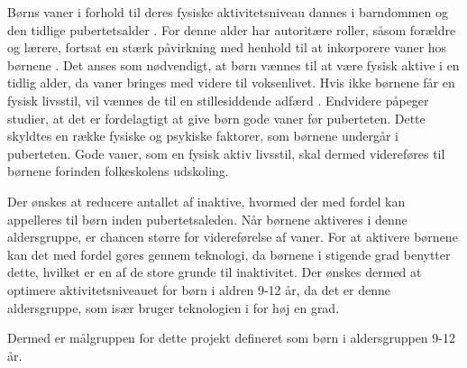Børns vaner i forhold til deres fysiske aktivitetsniveau dannes i barndommen og den tidlige pubertetsalder \citep{F.SallisG.Simons-MortonJ.Stone1992}. For denne alder har autoritære roller, såsom forældre og lærere, fortsat en stærk påvirkning med henhold til at inkorporere vaner hos børnene \citep{L.MeyerP.Gullotta2012}. \newline
Det anses som nødvendigt, at børn vænnes til at være fysisk aktive i en tidlig alder, da vaner bringes med videre til voksenlivet. Hvis ikke børnene får en fysisk livsstil, vil vænnes de til en stillesiddende adfærd \citep{Nabe-NielsenSundhedsministerietetal.2005,P.J.KremersBrug2008,L.MeyerP.Gullotta2012}. Endvidere påpeger studier, at det er fordelagtigt at give børn gode vaner før puberteten. Dette skyldtes en række fysiske og psykiske faktorer, som børnene undergår i puberteten. Gode vaner, som en fysisk aktiv livsstil, skal dermed videreføres til børnene forinden folkeskolens udskoling. \citep{F.SallisG.Simons-MortonJ.Stone1992,L.MeyerP.Gullotta2012,P.J.KremersBrug2008}

Der ønskes at reducere antallet af inaktive, hvormed der med fordel kan appelleres til børn inden pubertetsaleden. Når børnene aktiveres i denne aldersgruppe, er chancen større for videreførelse af vaner. For at aktivere børnene kan det med fordel gøres gennem teknologi, da børnene i stigende grad benytter dette, hvilket er en af de store grunde til inaktivitet. Der ønskes dermed at optimere aktivitetsniveauet for børn i aldren 9-12 år, da det er denne aldersgruppe, som især bruger teknologien i for høj en grad. 




Dermed er målgruppen for dette projekt defineret som børn i aldersgruppen 9-12 år.